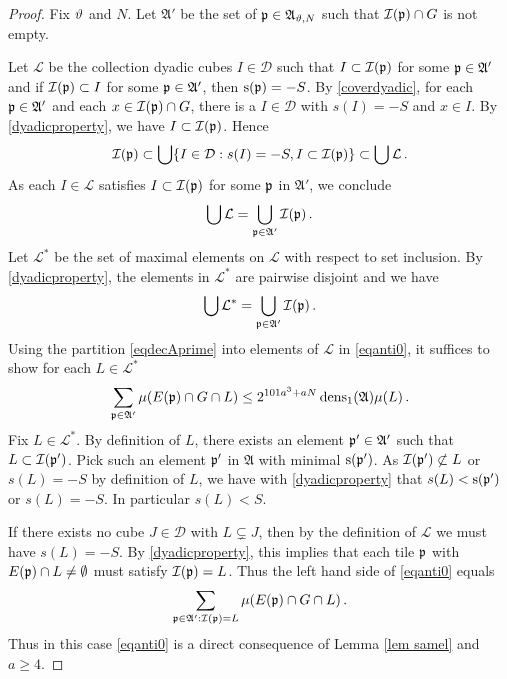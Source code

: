 {\begin{proof}
{Fix $\vartheta$ and $N$. Let
$\mathfrak{A}'$ be the set of $\mathfrak p\in\mathfrak{A}_{\vartheta,N}$ such that $\mathcal{I}(\mathfrak p)\cap G$ is not empty.}


   Let $\mathcal{L}$ be the collection dyadic cubes $I\in\mathcal{D}$ such that $I\subset \mathcal{I}(\mathfrak p)$ for some $\mathfrak p\in\mathfrak{A}'$ and if $\mathcal{I}(\mathfrak p)\subset I$ for some $\mathfrak p\in\mathfrak{A}'$, then $\mathrm{s}(\mathfrak p)=-S$. By \eqref{coverdyadic}, for each $\mathfrak p \in \mathfrak{A}'$
   and each $x\in \mathcal{I}(\mathfrak p)\cap G$, there is a $I\in \mathcal{D}$ with $s(I)=-S$ and $x\in I$. By \eqref{dyadicproperty},
   we have $I\subset \mathcal{I}(\mathfrak p)$. Hence
   \begin{equation}
       \mathcal{I}(\mathfrak p)\subset \bigcup\{I\in \mathcal{D}: s(I)=-S, I\subset \mathcal{I}(\mathfrak p)\}\subset \bigcup \mathcal{L}\, .
   \end{equation}
As each $I\in \mathcal{L}$ satisfies $I\subset \mathcal{I}(\mathfrak p)$ for some $\mathfrak p$ in $\mathfrak{A'}$, we conclude
     \begin{equation}
\bigcup\mathcal{L}=\bigcup_{\mathfrak p \in \mathfrak{A}'}\mathcal{I}(\mathfrak p)\, .
   \end{equation}
Let $\mathcal{L}^*$ be the set of maximal elements on $\mathcal{L}$ with respect to set inclusion.
By \eqref{dyadicproperty}, the elements in $\mathcal{L}^*$ are pairwise disjoint and we have
 \begin{equation}\label{eqdecAprime}
\bigcup\mathcal{L}^*=\bigcup_{\mathfrak p \in \mathfrak{A}'}\mathcal{I}(\mathfrak p)\, .
   \end{equation}
Using the partition \eqref{eqdecAprime} into elements of $\mathcal{L}$ in \eqref{eqanti0}, it suffices to show for each $L\in \mathcal{L}^*$
\begin{equation}\label{eqanti0}
    \sum_{\mathfrak p\in\mathfrak{A}'}\mu(E(\mathfrak p)\cap G \cap L)
    \le
    2^{101a^3+aN}
    \operatorname{\operatorname{dens}}_1(\mathfrak{A})\mu(L)\,.
\end{equation}
Fix $L\in \mathcal{L}^*$.
By definition of $L$, there exists an element $\mathfrak p'\in \mathfrak{A}'$ such that $L\subset \mathcal{I}(\mathfrak p')$. Pick such an element $\mathfrak p
'$
in $\mathfrak{A}$ with minimal $\mathrm{s}(\mathfrak p')$. As $\mathcal{I}(\mathfrak p')\not \subset L$ or $s(L) = -S$ by definition of $L$, we have
with \eqref{dyadicproperty} that $s(L)< \mathrm{s}(\mathfrak p')$ or $s(L) = -S$. In particular $s(L)<S$.

If there exists no cube $J \in \mathcal{D}$ with $L \subsetneq J$, then by the definition of $\mathcal{L}$ we must have $s(L) = -S$. By \eqref{dyadicproperty}, this implies that each tile $\mathfrak p$ with $E(\mathfrak p) \cap L \ne \emptyset$ must satisfy $\mathcal{I}(\mathfrak p) = L$. Thus the left hand side of \eqref{eqanti0} equals
\begin{equation}
    \sum_{\mathfrak p\in\mathfrak{A}':\mathcal{I}(\mathfrak p)=L}\mu(E(\mathfrak p)\cap G\cap L)\,.
\end{equation}
Thus in this case \eqref{eqanti0} is a direct consequence of Lemma \ref{lem samel} and $a \ge 4$.


\end{proof}}

